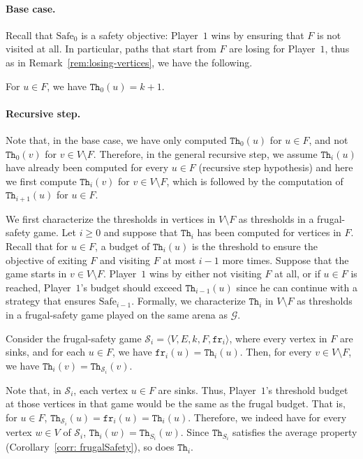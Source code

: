 \documentclass{article}\providecommand{\nequiv}{\not\equiv}\usepackage[a4paper,margin=20mm]{geometry}
\newcommand{\PO}{Player~$1$\xspace}
\newcommand{\G}{{\mathcal G}}
\renewcommand{\S}{{\mathcal S}}
\newcommand{\fr}{\texttt{fr}}
\newcommand{\notF}{V \setminus F}
\newcommand{\thresh}{\texttt{Th}\xspace}
\newcommand{\safe}{\text{Safe}}
\newcommand{\zug}[1]{\langle #1  \rangle}
\begin{document}
\paragraph*{Base case.}
Recall that $\safe_0$ is a safety objective: \PO wins by ensuring that $F$ is not visited at all. In particular, paths that start from $F$ are losing for \PO, thus as in Remark~\ref{rem:losing-vertices}, we have the following.

\begin{lemma}
For $u \in F$, we have $\thresh_0(u) = k+1$. 
\end{lemma}

\paragraph*{Recursive step.}

Note that, in the base case, we have only computed \(\thresh_0(u)\) for \(u \in F\), and not \(\thresh_0(v)\) for \(v \in V \setminus F\). 
Therefore, in the general recursive step, we assume \(\thresh_i(u)\) have already been computed for every \(u \in F\) (recursive step hypothesis) and here we first compute \(\thresh_i(v)\) for \(v \in V \setminus F\), which is followed by the computation of \(\thresh_{i+1}(u)\) for \(u \in F\). 
 
We first characterize the thresholds in vertices in $\notF$ as thresholds in a frugal-safety game. 
Let $i \geq 0$ and suppose that $\thresh_i$ has been computed for vertices in $F$. Recall that for $u \in F$, a budget of $\thresh_i(u)$ is the threshold to ensure the objective of exiting $F$ and visiting $F$ at most $i-1$ more times. Suppose that the game starts in $v \in \notF$. \PO wins by either not visiting $F$ at all, or if $u \in F$ is reached, \PO's budget should exceed $\thresh_{i-1}(u)$ since he can continue with a strategy that ensures $\safe_{i-1}$. Formally, we characterize $\thresh_i$ in $\notF$ as thresholds in a frugal-safety game played on the same arena as $\G$. 

\begin{lemma}\label{lem: frugalsafetytoSafei}
Consider the frugal-safety game $\S_i = \zug{V, E, k, F, \fr_i}$, where every vertex in \(F\) are sinks, and for each $u \in F$, we have $\fr_i(u) = \thresh_{i}(u)$. 
Then, for every $v \in \notF$, we have $\thresh_i(v) = \thresh_{\S_i}(v)$. 
\end{lemma}

\begin{remark}\label{rem: averagepropertyinherit}
	Note that, in \(\S_i\), each vertex \(u \in F\) are sinks. Thus, \PO's threshold budget at those vertices in that game would be the same as the frugal budget. That is, for \(u \in F\), \(\thresh_{\S_i}(u) = \fr_i(u) = \thresh_i(u)\). Therefore, we indeed have for every vertex \(w \in V\) of \(\S_i\), \(\thresh_i(w) = \thresh_{S_i}(w)\). 
	Since \(\thresh_{S_i}\) satisfies the average property (Corollary~\ref{corr: frugalSafety}), so does \(\thresh_i\). 
\end{remark}
\end{document}
